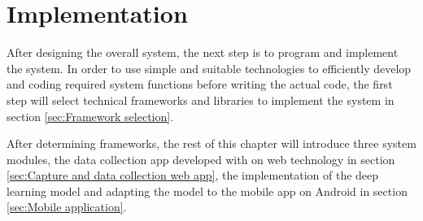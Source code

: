 \chapter{Implementation}
\label{chap:Implementation}
After designing the overall system, the next step is to program and implement the system.
In order to use simple and suitable technologies to efficiently develop and coding required system functions before writing the actual code, the first step will select technical frameworks and libraries to implement the system in section \ref{sec:Framework selection}.

After determining frameworks, the rest of this chapter will introduce three system modules, the data collection app developed with on web technology in section \ref{sec:Capture and data collection web app}, the implementation of the deep learning model and adapting the model to the mobile app on Android in section \ref{sec:Mobile application}.



